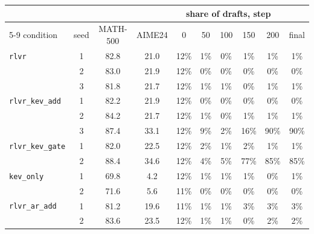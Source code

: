 \begin{tabular}{@{}lccccccccc@{}}
\toprule
& & & & \multicolumn{5}{c}{share of drafts, step} & \\ \cmidrule(lr){5-9}
condition & seed & MATH-500 & AIME24 & 0 & 50 & 100 & 150 & 200 & final \\ \midrule
\texttt{rlvr} & 1 & 82.8 & 21.0 & 12\% & 1\% & 0\% & 1\% & 1\% & 1\% \\
 & 2 & 83.0 & 21.9 & 12\% & 0\% & 0\% & 0\% & 0\% & 0\% \\
 & 3 & 81.8 & 21.7 & 12\% & 1\% & 1\% & 0\% & 1\% & 1\% \\
\addlinespace
\texttt{rlvr\_kev\_add} & 1 & 82.2 & 21.9 & 12\% & 0\% & 0\% & 0\% & 0\% & 0\% \\
 & 2 & 84.2 & 21.7 & 12\% & 1\% & 0\% & 1\% & 1\% & 1\% \\
 & 3 & 87.4 & 33.1 & 12\% & 9\% & 2\% & 16\% & 90\% & 90\% \\
\addlinespace
\texttt{rlvr\_kev\_gate} & 1 & 82.0 & 22.5 & 12\% & 2\% & 1\% & 2\% & 1\% & 1\% \\
 & 2 & 88.4 & 34.6 & 12\% & 4\% & 5\% & 77\% & 85\% & 85\% \\
\addlinespace
\texttt{kev\_only} & 1 & 69.8 & 4.2 & 12\% & 1\% & 1\% & 1\% & 0\% & 1\% \\
 & 2 & 71.6 & 5.6 & 11\% & 0\% & 0\% & 0\% & 0\% & 0\% \\
\addlinespace
\texttt{rlvr\_ar\_add} & 1 & 81.2 & 19.6 & 11\% & 1\% & 1\% & 3\% & 3\% & 3\% \\
 & 2 & 83.6 & 23.5 & 12\% & 1\% & 1\% & 0\% & 2\% & 2\% \\
\bottomrule
\end{tabular}
